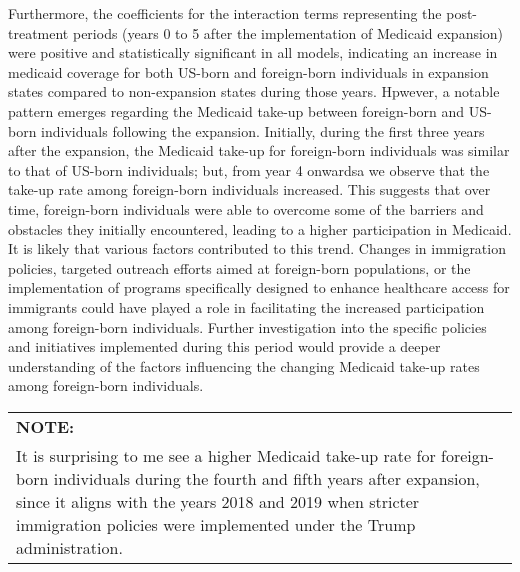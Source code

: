 \documentclass[
]{article}
\begin{document}
Furthermore, the coefficients for the interaction terms representing the
post-treatment periods (years 0 to 5 after the implementation of
Medicaid expansion) were positive and statistically significant in all
models, indicating an increase in medicaid coverage for both US-born and
foreign-born individuals in expansion states compared to non-expansion
states during those years. Hpwever, a notable pattern emerges regarding
the Medicaid take-up between foreign-born and US-born individuals
following the expansion. Initially, during the first three years after
the expansion, the Medicaid take-up for foreign-born individuals was
similar to that of US-born individuals; but, from year 4 onwardsa we
observe that the take-up rate among foreign-born individuals increased.
This suggests that over time, foreign-born individuals were able to
overcome some of the barriers and obstacles they initially encountered,
leading to a higher participation in Medicaid. It is likely that various
factors contributed to this trend. Changes in immigration policies,
targeted outreach efforts aimed at foreign-born populations, or the
implementation of programs specifically designed to enhance healthcare
access for immigrants could have played a role in facilitating the
increased participation among foreign-born individuals. Further
investigation into the specific policies and initiatives implemented
during this period would provide a deeper understanding of the factors
influencing the changing Medicaid take-up rates among foreign-born
individuals.

\begin{longtable}[]{@{}
  >{\centering\arraybackslash}p{}@{}}
\toprule\noalign{}
\endhead
\bottomrule\noalign{}
\endlastfoot
\textbf{NOTE:} \\
It is surprising to me see a higher Medicaid take-up rate for
foreign-born individuals during the fourth and fifth years after
expansion, since it aligns with the years 2018 and 2019 when stricter
immigration policies were implemented under the Trump administration. \\
\end{longtable}

\FloatBarrier
\end{document}
